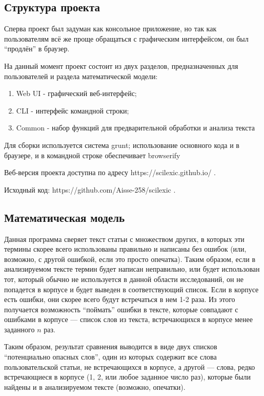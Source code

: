 \documentclass[a4paper,openbib]{report}
\begin{document}
\subsection*{Структура проекта}

Сперва проект был задуман как консольное приложение, но так как пользователям всё же проще обращаться с графическим интерфейсом, он был ``продлён'' в браузер.

На данный момент проект состоит из двух разделов, предназначенных для пользователей и раздела математической модели:
\begin{enumerate}
\item
 Web UI - графический веб-интерфейс;
\item
 CLI - интерфейс командной строки;
\item
 Common - набор функций для предварительной обработки и анализа текста
\end{enumerate}
 
Для сборки используется система grunt; использование основного кода и в браузере, и в командной строке обеспечивает browserify

Веб-версия проекта доступна по адресу https://scilexic.github.io/ .

Исходный код: https://github.com/Aisse-258/scilexic .
\subsection*{Математическая модель}

 Данная программа сверяет текст статьи с множеством других, в которых эти термины скорее всего использованы правильно и написаны без ошибок 
(или, возможно, с другой ошибкой, если это просто опечатка). Таким образом, если в анализируемом тексте термин будет написан неправильно, 
или будет использован тот, который обычно не используется в данной области исследований, он не попадется в корпусе и будет выведен в соответствующий список. 
Если в корпусе есть ошибки, они скорее всего будут встречаться в нем 1-2 раза. Из этого получается возможность ``поймать'' ошибки в тексте, 
которые совпадают с ошибками в корпусе --- список слов из текста, встречающихся в корпусе менее заданного $n$ раз.

Таким образом, результат сравнения выводится в виде двух списков ``потенциально опасных слов'', один 
из которых содержит все слова пользовательской статьи, не встречающихся в корпусе, а другой --- слова, редко встречающиеся в 
корпусе (1, 2, или любое заданное число раз), которые были найдены и в анализируемом тексте (возможно, опечатки).
\end{document}
